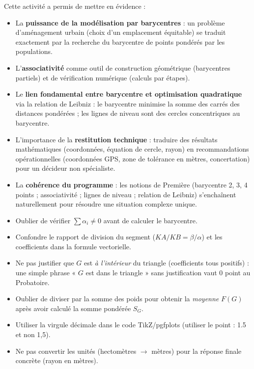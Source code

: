 \documentclass[11pt]{article}
\begin{document}
\begin{aretenir}
Cette activité a permis de mettre en évidence :
\begin{itemize}
    \item La \textbf{puissance de la modélisation par barycentres} : un problème d'aménagement urbain (choix d'un emplacement équitable) se traduit exactement par la recherche du barycentre de points pondérés par les populations.
    \item L'\textbf{associativité} comme outil de construction géométrique (barycentres partiels) et de vérification numérique (calculs par étapes).
    \item Le \textbf{lien fondamental entre barycentre et optimisation quadratique} via la relation de Leibniz : le barycentre minimise la somme des carrés des distances pondérées ; les lignes de niveau sont des cercles concentriques au barycentre.
    \item L'importance de la \textbf{restitution technique} : traduire des résultats mathématiques (coordonnées, équation de cercle, rayon) en recommandations opérationnelles (coordonnées GPS, zone de tolérance en mètres, concertation) pour un décideur non spécialiste.
    \item La \textbf{cohérence du programme} : les notions de Première (barycentre 2, 3, 4 points ; associativité ; lignes de niveau ; relation de Leibniz) s'enchaînent naturellement pour résoudre une situation complexe unique.
\end{itemize}
\end{aretenir}

\begin{attention}
\begin{itemize}
\item Oublier de vérifier $\sum\alpha_i \neq 0$ avant de calculer le barycentre.
\item Confondre le rapport de division du segment ($KA/KB = \beta/\alpha$) et les coefficients dans la formule vectorielle.
\item Ne pas justifier que $G$ est \emph{à l'intérieur} du triangle (coefficients tous positifs) : une simple phrase « $G$ est dans le triangle » sans justification vaut 0 point au Probatoire.
\item Oublier de diviser par la somme des poids pour obtenir la \emph{moyenne} $F(G)$ après avoir calculé la somme pondérée $S_G$.
\item Utiliser la virgule décimale dans le code TikZ/pgfplots (utiliser le point : 1.5 et non 1,5).
\item Ne pas convertir les unités (hectomètres $\rightarrow$ mètres) pour la réponse finale concrète (rayon en mètres).
\end{itemize}
\end{attention}
\end{document}
